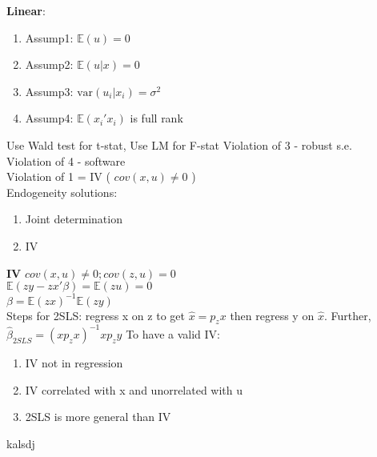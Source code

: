 \documentclass[3pt, a4paper]{article}
\newcommand{\EE}{\mathbb E}
\newcommand{\var}{\text{var}}
\begin{document}
\noindent
\begin{minipage}[t]{0.5\textwidth}
  \textbf{Linear}:
    \begin{enumerate}
      \item Assump1: $\EE(u) = 0$
      \item Assump2: $\EE(u|x) = 0$
      \item Assump3: $\var(u_i|x_i) = \sigma^2$
      \item Assump4: $\EE(x_i'x_i)$ is full rank 
    \end{enumerate}
    Use Wald test for t-stat, Use LM for F-stat
    Violation of 3 - robust s.e.\\
    Violation of 4 - software\\
    Violation of 1 = IV ( $cov(x,u)\ne0$ ) \\
    Endogeneity solutions:
    \begin{enumerate}
      \item Joint determination
      \item IV \\
    \end{enumerate}
  \textbf{IV}
    $cov(x,u)\ne0;cov(z,u)=0$\\
    $\EE(zy-zx'\beta)=\EE(zu)=0$\\
      \rightarrow $\beta = \EE(zx)^{-1}\EE(zy)$ \\
    Steps for 2SLS:
      regress x on z to get $\hat{x} = p_zx$ then regress y on $\hat{x}$. Further, $\hat{\beta}_{2SLS} = (xp_zx)^{-1}xp_zy$
    To have a valid IV:
    \begin{enumerate}
      \item IV not in regression
      \item IV correlated with x and unorrelated with u
      \item 2SLS is more general than IV
    \end{enumerate}
\end{minipage}%
\begin{minipage}[t]{0.4\textwidth}
  kalsdj
\end{minipage}  
\newpage
\end{document}
